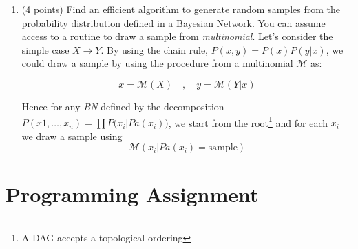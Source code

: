 \documentclass[10pt]{article}
\begin{document}
\begin{enumerate}
\item (4 points) Find an efficient algorithm to generate random samples from the
  probability distribution defined in a Bayesian Network. You can assume access
  to a routine to draw a sample from \emph{multinomial}.
  Let's consider the simple case $X\rightarrow Y$. By using the chain rule,
  $P(x,y) = P(x) P(y|x)$, we could draw a sample by using the procedure from a
  multinomial $\mathcal{M}$ as:

  $$
  x = \mathcal{M}(X)\quad, \quad y=\mathcal{M}(Y|x)
  $$

  Hence for any \emph{BN} defined by the decomposition $P(x1,\ldots,x_n)=\prod
  P\big(x_i|Pa(x_i)\big)$, we start from the root\footnote{A DAG accepts a
  topological ordering} and for each $x_i$ we draw a sample using 
  \begin{equation}
    \mathcal{M}(x_i| Pa(x_i) = \text{sample})
  \end{equation}
\end{enumerate}

\section{Programming Assignment}%
\label{sec:programming_assignment}
\end{document}
